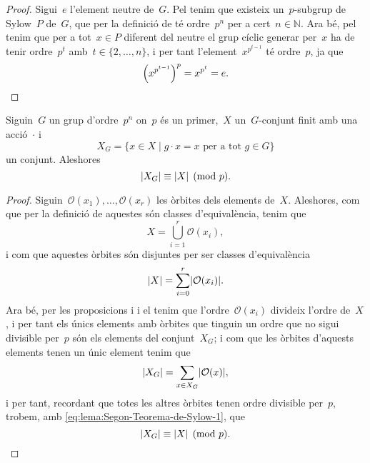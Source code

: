 \documentclass[../../main.tex]{subfiles}
\begin{document}
    \begin{proof}
        Sigui~\(e\) l'element neutre de~\(G\).
        Pel  tenim que existeix un~\(p\)-subgrup de Sylow~\(P\) de~\(G\), que per la definició de  té ordre~\(p^{n}\) per a cert~\(n\in\mathbb{N}\).
        Ara bé, pel  tenim que per a tot~\(x\in P\) diferent del neutre el grup cíclic generar per~\(x\) ha de tenir ordre~\(p^{t}\) amb~\(t\in\{2,\dots,n\}\), i per tant l'element~\(x^{p^{t-1}}\) té ordre~\(p\), ja que
        \[
            \left(x^{p^{t-1}}\right)^{p}=x^{p^{t}}=e.\qedhere
        \]
    \end{proof}
    \begin{lemma}
        \label{lema:Segon-Teorema-de-Sylow}
        Siguin~\(G\) un grup d'ordre~\(p^{n}\) on~\(p\) és un primer,~\(X\) un~\(G\)-conjunt finit amb una acció~\(\cdot\) i
        \[
            X_{G}=\{x\in X\mid g\cdot x=x\text{ per a tot }g\in G\}
        \]
        un conjunt.
        Aleshores
        \[
            \abs{X_{G}}\equiv\abs{X}\pmod{p}.
        \]
    \end{lemma}
    \begin{proof}
        Siguin~\(\mathcal{O}(x_{1}),\dots,\mathcal{O}(x_{r})\) les òrbites dels elements de~\(X\).
        Aleshores, com que per la definició de  aquestes són classes d'equivalència, tenim que %
        \[
            X=\bigcup_{i=1}^{r}\mathcal{O}(x_{i}),
        \]
        i com que aquestes òrbites són disjuntes per ser classes d'equivalència
        \begin{equation}
    \label{eq:lema:Segon-Teorema-de-Sylow-1}
        \abs{X}=\sum_{i=0}^{r}\abs{\mathcal{O}(x_{i})}.
        \end{equation}
        Ara bé, per les proposicions  i  i el  tenim que l'ordre~\(\mathcal{O}(x_{i})\) divideix l'ordre de~\(X\), i per tant els únics elements amb òrbites que tinguin un ordre que no sigui divisible per~\(p\) són els elements del conjunt~\(X_{G}\); i com que les òrbites d'aquests elements tenen un únic element tenim que
        \[
            \abs{X_{G}}=\sum_{x\in X_{G}}\abs{\mathcal{O}(x)},
        \]
        i per tant, recordant que totes les altres òrbites tenen ordre divisible per~\(p\), trobem, amb \eqref{eq:lema:Segon-Teorema-de-Sylow-1}, que
        \[
            \abs{X_{G}}\equiv\abs{X}\pmod{p}.\qedhere
        \]
    \end{proof}
\end{document}
